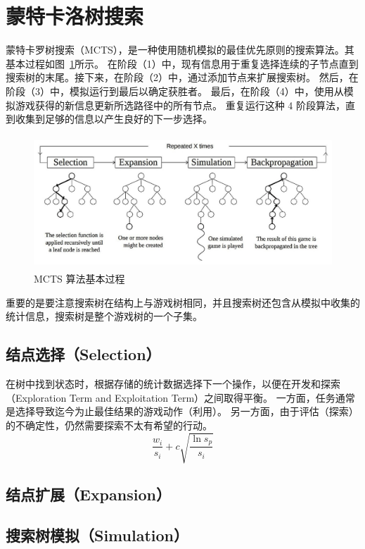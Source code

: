 \documentclass[UTF8,cs4size]{ctexart}
\begin{document}
\section{蒙特卡洛树搜索}
蒙特卡罗树搜索（MCTS），是一种使用随机模拟的最佳优先原则的搜索算法。其基本过程如图~\ref{fig:mcts_phase}所示。
在阶段（1）中，现有信息用于重复选择连续的子节点直到搜索树的末尾。接下来，在阶段（2）中，通过添加节点来扩展搜索树。
然后，在阶段（3）中，模拟运行到最后以确定获胜者。
最后，在阶段（4）中，使用从模拟游戏获得的新信息更新所选路径中的所有节点。
重复运行这种 4 阶段算法，直到收集到足够的信息以产生良好的下一步选择。

\begin{figure}[htb]
  \centering
  \includegraphics[width=\textwidth,height=5cm]{figures/final_mcts_phase.png}
  \caption{MCTS 算法基本过程\cite{DBLP:conf/aiide/ChaslotBSS08}}
  \label{fig:mcts_phase}
\end{figure}

重要的是要注意搜索树在结构上与游戏树相同，并且搜索树还包含从模拟中收集的统计信息，搜索树是整个游戏树的一个子集。

\subsection{结点选择（Selection）}
在树中找到状态时，根据存储的统计数据选择下一个操作，以便在开发和探索（Exploration Term and Exploitation Term）之间取得平衡。
一方面，任务通常是选择导致迄今为止最佳结果的游戏动作（利用）。 另一方面，由于评估（探索）的不确定性，仍然需要探索不太有希望的行动。
\begin{equation}
  \frac{w_i}{s_i} + c\sqrt{\frac{\ln{s_p}}{s_i}}
  \label{eq:uct}
\end{equation}

\subsection{结点扩展（Expansion）}
\subsection{搜索树模拟（Simulation）}
\end{document}
